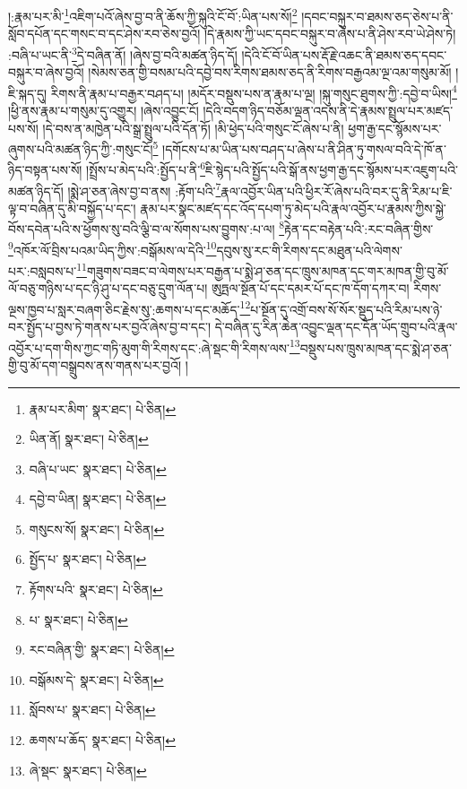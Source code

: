 །:རྣམ་པར་མི་\footnote{རྣམ་པར་མིག་  སྣར་ཐང་།  པེ་ཅིན། }འཇིག་པའོ་ཞེས་བྱ་བ་ནི་ཆོས་ཀྱི་སྐུའི་ངོ་བོ་:ཡིན་པས་སོ།\footnote{ཡིན་ནོ།  སྣར་ཐང་།  པེ་ཅིན། } །དབང་བསྐུར་བ་ཐམས་ཅད་ཅེས་པ་ནི་སློབ་དཔོན་དང་གསང་བ་དང་ཤེས་རབ་ཅེས་བྱའོ། །དེ་རྣམས་ཀྱི་ཡང་དབང་བསྐུར་བ་ཞེས་པ་ནི་ཤེས་རབ་ཡེ་ཤེས་ཏེ། :བཞི་པ་ཡང་ནི་\footnote{བཞི་པ་ཡང་  སྣར་ཐང་།  པེ་ཅིན། }དེ་བཞིན་ནོ། །ཞེས་བྱ་བའི་མཚན་ཉིད་དོ། །དེའི་ངོ་བོ་ཡིན་པས་རྡོ་རྗེ་འཆང་ནི་ཐམས་ཅད་དབང་བསྐུར་བ་ཞེས་བྱའོ། །སེམས་ཅན་གྱི་བསམ་པའི་དབྱེ་བས་རིགས་ཐམས་ཅད་ནི་རིགས་བརྒྱའམ་ལྔ་འམ་གསུམ་མོ། །ཇི་སྐད་དུ། རིགས་ནི་རྣམ་པ་བརྒྱར་བཤད་པ། །མདོར་བསྡུས་པས་ན་རྣམ་པ་ལྔ། །སྐུ་གསུང་ཐུགས་ཀྱི་:དབྱེ་བ་ཡིས།\footnote{དབྱེ་བ་ཡིན།  སྣར་ཐང་།  པེ་ཅིན། } །ཕྱི་ནས་རྣམ་པ་གསུམ་དུ་འགྱུར། །ཞེས་འབྱུང་ངོ། །དེའི་བདག་ཉིད་བཅོམ་ལྡན་འདས་ནི་དེ་རྣམས་སྤྲུལ་པར་མཛད་པས་སོ། །དེ་བས་ན་མཁྱེན་པའི་སྒྲ་སྤྲུལ་པའི་དོན་ཏོ། །མི་ཕྱེད་པའི་གསུང་ངོ་ཞེས་པ་ནི། ཕྱག་རྒྱ་དང་སྙོམས་པར་ཞུགས་པའི་མཚན་ཉིད་ཀྱི་:གསུང་ངོ།\footnote{གསུངས་སོ།  སྣར་ཐང་།  པེ་ཅིན། } །དགོངས་པ་མ་ཡིན་པས་བཤད་པ་ཞེས་པ་ནི་ཤིན་ཏུ་གསལ་བའི་དེ་ཁོ་ན་ཉིད་བསྟན་པས་སོ། །སྤྲོས་པ་མེད་པའི་:སྤྱོད་པ་ནི་\footnote{སྤྱོད་པ་  སྣར་ཐང་།  པེ་ཅིན། }ཇི་སྙེད་པའི་སྤྱོད་པའི་སྒོ་ནས་ཕྱག་རྒྱ་དང་སྙོམས་པར་འཇུག་པའི་མཚན་ཉིད་དོ། །སྨེ་ཤ་ཅན་ཞེས་བྱ་བ་ནས། :རྟོག་པའི་\footnote{རྟོགས་པའི་  སྣར་ཐང་།  པེ་ཅིན། }རྣལ་འབྱོར་ཡིན་པའི་ཕྱིར་རོ་ཞེས་པའི་བར་དུ་ནི་རིམ་པ་ཇི་ལྟ་བ་བཞིན་དུ་མི་བསྐྱོད་པ་དང་། རྣམ་པར་སྣང་མཛད་དང་འོད་དཔག་ཏུ་མེད་པའི་རྣལ་འབྱོར་པ་རྣམས་ཀྱིས་སྐྱེ་བོས་དབེན་པའི་ས་ཕྱོགས་སུ་བའི་ལྕི་བ་ལ་སོགས་པས་བྱུགས་:པ་ལ། \footnote{པ་  སྣར་ཐང་།  པེ་ཅིན། }རྟེན་དང་བརྟེན་པའི་:རང་བཞིན་གྱིས་\footnote{རང་བཞིན་གྱི་  སྣར་ཐང་།  པེ་ཅིན། }འཁོར་ལོ་བྲིས་པའམ་ཡིད་ཀྱིས་:བསྒོམས་ལ་དེའི་\footnote{བསྒོམས་དེ་  སྣར་ཐང་།  པེ་ཅིན། }དབུས་སུ་རང་གི་རིགས་དང་མཐུན་པའི་ལེགས་པར་:བསླབས་པ་\footnote{སློབས་པ་  སྣར་ཐང་།  པེ་ཅིན། }གཟུགས་བཟང་བ་ལེགས་པར་བརྒྱན་པ་སྨེ་ཤ་ཅན་དང་ཁྲུས་མཁན་དང་གར་མཁན་གྱི་བུ་མོ་ལོ་བཅུ་གཉིས་པ་དང་ཉི་ཤུ་པ་དང་བཅུ་དྲུག་ལོན་པ། ཨུཏྤལ་སྔོན་པོ་དང་དམར་པོ་དང་ཁ་དོག་དཀར་བ། རིགས་ལྔས་ཁྱབ་པ་སླར་བཞག་ཅིང་རྗེས་སུ་:ཆགས་པ་དང་མཆོད་\footnote{ཆགས་པ་ཆོད་  སྣར་ཐང་།  པེ་ཅིན། }པ་སྔོན་དུ་འགྲོ་བས་སོ་སོར་སྡུད་པའི་རིམ་པས་ཉེ་བར་སྤྱོད་པ་བྱས་ཏེ་གནས་པར་བྱའོ་ཞེས་བྱ་བ་དང་། དེ་བཞིན་དུ་རིན་ཆེན་འབྱུང་ལྡན་དང་དོན་ཡོད་གྲུབ་པའི་རྣལ་འབྱོར་པ་དག་གིས་ཀྱང་གཏི་མུག་གི་རིགས་དང་:ཞེ་སྡང་གི་རིགས་ལས་\footnote{ཞེ་སྡང་  སྣར་ཐང་།  པེ་ཅིན། }བསྡུས་པས་ཁྲུས་མཁན་དང་སྨེ་ཤ་ཅན་གྱི་བུ་མོ་དག་བསྒྲུབས་ནས་གནས་པར་བྱའོ། །
